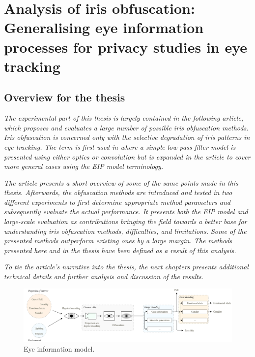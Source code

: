 \chapter{Analysis of iris obfuscation: Generalising eye information processes for privacy studies in eye tracking}\label{ch:article}

\section*{Overview for the thesis}

\emph{
The experimental part of this thesis is largely contained in the following article, which proposes and evaluates a large number of possible iris obfuscation methods. Iris obfuscation is concerned only with the selective degradation of iris patterns in eye-tracking. The term is first used in \cite{BRENDAN_BLUR} where a simple low-pass filter model is presented using either optics or convolution but is expanded in the article to cover more general cases using the EIP model terminology. }

\emph{The article presents a short overview of some of the same points made in this thesis. Afterwards, the obfuscation methods are introduced and tested in two different experiments to first determine appropriate method parameters and subsequently evaluate the actual performance. It presents both the EIP model and large-scale evaluation as contributions bringing the field towards a better base for understanding iris obfuscation methods, difficulties, and limitations. Some of the presented methods outperform existing ones by a large margin. The methods presented here and in the thesis have been defined as a result of this analysis.}

\emph{To tie the article's narrative into the thesis, the next chapters presents additional technical details and further analysis and discussion of the results.}


\begin{figure}[b]
    \centering
    \includegraphics[width=1\textwidth]{figures/Model.pdf}
    \caption{Eye information model.}
    \label{fig:overview}
\end{figure}








% 


